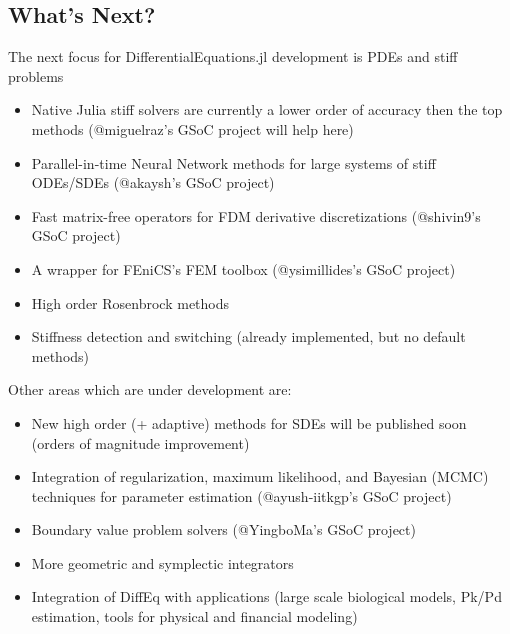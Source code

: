 \documentclass[11pt]{article}
\begin{document}
    \subsection{What's Next?}\label{whats-next}

The next focus for DifferentialEquations.jl development is PDEs and
stiff problems

\begin{itemize}
\itemsep1pt\parskip0pt
\item
  Native Julia stiff solvers are currently a lower order of accuracy
  then the top methods (@miguelraz's GSoC project will help here)
\item
  Parallel-in-time Neural Network methods for large systems of stiff
  ODEs/SDEs (@akaysh's GSoC project)
\item
  Fast matrix-free operators for FDM derivative discretizations
  (@shivin9's GSoC project)
\item
  A wrapper for FEniCS's FEM toolbox (@ysimillides's GSoC project)
\item
  High order Rosenbrock methods
\item
  Stiffness detection and switching (already implemented, but no default
  methods)
\end{itemize}

    Other areas which are under development are:

\begin{itemize}
\itemsep1pt\parskip0pt
\item
  New high order (+ adaptive) methods for SDEs will be published soon
  (orders of magnitude improvement)
\item
  Integration of regularization, maximum likelihood, and Bayesian (MCMC)
  techniques for parameter estimation (@ayush-iitkgp's GSoC project)
\item
  Boundary value problem solvers (@YingboMa's GSoC project)
\item
  More geometric and symplectic integrators
\item
  Integration of DiffEq with applications (large scale biological
  models, Pk/Pd estimation, tools for physical and financial modeling)
\end{itemize}


    
    
    
    
\end{document}
